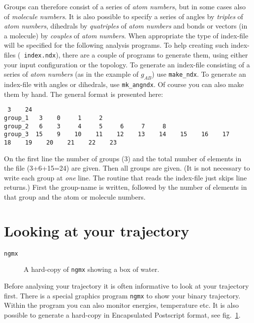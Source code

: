 Groups can therefore consist of a series of {\em atom numbers}, but in
some cases also of {\em molecule numbers}.  It is also possible to
specify a series of angles by {\em triples} of {\em atom numbers},
dihedrals by {\em quatriples} of {\em atom numbers} and bonds or
vectors (in a molecule) by {\em couples} of {\em atom numbers}. When
appropriate the type of index-file will be specified for the following
analysis programs.  To help creating such index-files ({\tt
index.ndx}), there are a couple of programs to generate them, using
either your input configuration or the topology.  To generate an
index-file consisting of a series of {\em atom numbers} (as in the
example of $g_{AB}$) use {\tt make\_ndx}. To generate an index-file
with angles or dihedrals, use {\tt mk\_angndx}. Of course you can also
make them by hand. The general format is presented here:
\begin{verbatim}
 3    24
group_1   3    0     1     2
group_2   6    3     4     5     6     7     8
group_3  15    9    10    11    12    13    14    15    16    17    
18    19    20    21    22    23
\end{verbatim}
On the first line the number of groups (3) and the total number of elements 
in the file (3+6+15=24) are given. Then all groups are given. 
(It is not necessary to write each group at {\em one} line. The routine that 
reads the index-file just skips line returns.) First the group-name is 
written, followed by the number of elements in that group and the atom or 
molecule numbers.
%
%
\section{Looking at your trajectory}
\label{sec:lookwhostalking}
\begin{verbatim}
ngmx
\end{verbatim}
%
\begin{figure}[hbtp]
\centerline{
{}}
\caption{A hard-copy of {\tt ngmx} showing a box of water.}
\label{fig:ngmxdump}
\end{figure}
%
Before analysing your trajectory it is often informative to look at your 
trajectory first. There is a special graphics program {\tt ngmx} to show your 
binary trajectory. Within the program you can also monitor energies, 
temperature etc. It is also possible to generate a hard-copy in Encapsulated 
Postscript format, see fig.~\ref{fig:ngmxdump}.
%
%
